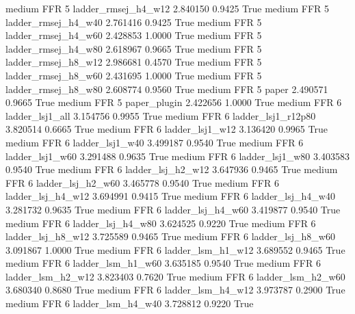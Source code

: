     medium      FFR                 5    ladder_rmsej_h4_w12   2.840150      0.9425    True
    medium      FFR                 5    ladder_rmsej_h4_w40   2.761416      0.9425    True
    medium      FFR                 5    ladder_rmsej_h4_w60   2.428853      1.0000    True
    medium      FFR                 5    ladder_rmsej_h4_w80   2.618967      0.9665    True
    medium      FFR                 5    ladder_rmsej_h8_w12   2.986681      0.4570    True
    medium      FFR                 5    ladder_rmsej_h8_w60   2.431695      1.0000    True
    medium      FFR                 5    ladder_rmsej_h8_w80   2.608774      0.9560    True
    medium      FFR                 5                  paper   2.490571      0.9665    True
    medium      FFR                 5           paper_plugin   2.422656      1.0000    True
    medium      FFR                 6        ladder_lsj1_all   3.154756      0.9955    True
    medium      FFR                 6     ladder_lsj1_r12p80   3.820514      0.6665    True
    medium      FFR                 6        ladder_lsj1_w12   3.136420      0.9965    True
    medium      FFR                 6        ladder_lsj1_w40   3.499187      0.9540    True
    medium      FFR                 6        ladder_lsj1_w60   3.291488      0.9635    True
    medium      FFR                 6        ladder_lsj1_w80   3.403583      0.9540    True
    medium      FFR                 6      ladder_lsj_h2_w12   3.647936      0.9465    True
    medium      FFR                 6      ladder_lsj_h2_w60   3.465778      0.9540    True
    medium      FFR                 6      ladder_lsj_h4_w12   3.694991      0.9415    True
    medium      FFR                 6      ladder_lsj_h4_w40   3.281732      0.9635    True
    medium      FFR                 6      ladder_lsj_h4_w60   3.419877      0.9540    True
    medium      FFR                 6      ladder_lsj_h4_w80   3.624525      0.9220    True
    medium      FFR                 6      ladder_lsj_h8_w12   3.725589      0.9465    True
    medium      FFR                 6      ladder_lsj_h8_w60   3.091867      1.0000    True
    medium      FFR                 6      ladder_lsm_h1_w12   3.689552      0.9465    True
    medium      FFR                 6      ladder_lsm_h1_w60   3.635185      0.9540    True
    medium      FFR                 6      ladder_lsm_h2_w12   3.823403      0.7620    True
    medium      FFR                 6      ladder_lsm_h2_w60   3.680340      0.8680    True
    medium      FFR                 6      ladder_lsm_h4_w12   3.973787      0.2900    True
    medium      FFR                 6      ladder_lsm_h4_w40   3.728812      0.9220    True
